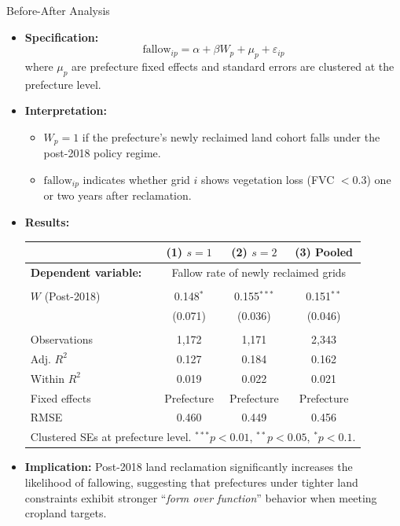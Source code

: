 \documentclass[10pt, xcolor=x11names,compress, aspectratio=169]{beamer}
\begin{document}
\begin{frame}{Before-After Analysis}

\begin{itemize}
    \item \textbf{Specification:}
    \[
        \text{fallow}_{ip} = \alpha + \beta W_p + \mu_p + \varepsilon_{ip}
    \]
    where $\mu_p$ are prefecture fixed effects and standard errors are clustered at the prefecture level.

    \vspace{0.8em}
    
    \item \textbf{Interpretation:}
    \begin{itemize}
        \item $W_p = 1$ if the prefecture’s newly reclaimed land cohort falls under the post-2018 policy regime.
        \item $\text{fallow}_{ip}$ indicates whether grid $i$ shows vegetation loss (FVC $<0.3$) one or two years after reclamation.
    \end{itemize}

    \vspace{0.8em}
    \item \textbf{Results:}
    \begin{table}[h!]
    \centering
    \footnotesize
    \begin{tabular}{lccc}
    \hline\hline
    & (1) $s=1$ & (2) $s=2$ & (3) Pooled \\
    \hline
    \textbf{Dependent variable:} & \multicolumn{3}{c}{Fallow rate of newly reclaimed grids} \\
    \\[-0.7em]
    $W$ (Post-2018) & 0.148$^{*}$ & 0.155$^{***}$ & 0.151$^{**}$ \\
    & (0.071) & (0.036) & (0.046) \\
    \\[-0.7em]
    Observations & 1,172 & 1,171 & 2,343 \\
    Adj. $R^2$ & 0.127 & 0.184 & 0.162 \\
    Within $R^2$ & 0.019 & 0.022 & 0.021 \\
    Fixed effects & Prefecture & Prefecture & Prefecture \\
    RMSE & 0.460 & 0.449 & 0.456 \\
    \hline
    \multicolumn{4}{l}{\footnotesize Clustered SEs at prefecture level. $^{***}p<0.01$, $^{**}p<0.05$, $^{*}p<0.1$.}\\
    \hline\hline
    \end{tabular}
    \end{table}

    \vspace{0.5em}
    \item \textbf{Implication:}  
    Post-2018 land reclamation significantly increases the likelihood of fallowing, suggesting that 
    prefectures under tighter land constraints exhibit stronger “\textit{form over function}” behavior 
    when meeting cropland targets.
\end{itemize}

\end{frame}
\end{document}
